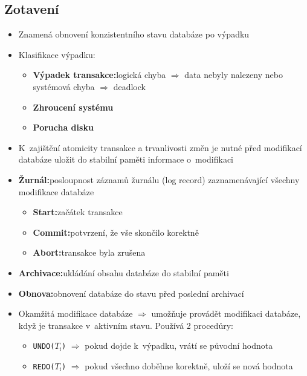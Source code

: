 \documentclass[a4paper,10pt]{article}
\newcommand{\pojem}[2]{\item \textbf{#1:}\quad #2}
\newcommand{\tedy}{$\Rightarrow$ }
\begin{document}
    \subsection{Zotavení}
      \begin{itemize}
        \item Znamená obnovení konzistentního stavu databáze po výpadku
        \item Klasifikace výpadku:
        \begin{itemize}
          \pojem{Výpadek transakce}{logická chyba \tedy data nebyly nalezeny nebo systémová chyba \tedy deadlock}
          \item \textbf{Zhroucení systému}
          \item \textbf{Porucha disku}
        \end{itemize}
        \item K~zajištění atomicity transakce a trvanlivosti změn je nutné před modifikací databáze uložit do stabilní paměti informace o~modifikaci
        \pojem{Žurnál}{posloupnost záznamů žurnálu (log record) zaznamenávající všechny modifikace databáze}
        \begin{itemize}
          \pojem{Start}{začátek transakce}
          \pojem{Commit}{potvrzení, že vše skončilo korektně}
          \pojem{Abort}{transakce byla zrušena}
        \end{itemize}
        \pojem{Archivace}{ukládání obsahu databáze do stabilní paměti}
        \pojem{Obnova}{obnovení databáze do stavu před poslední archivací}
        \item Okamžitá modifikace databáze \tedy umožňuje provádět modifikaci databáze, když je transakce v~aktivním stavu. Používá 2 procedůry:
        \begin{itemize}
          \item \texttt{UNDO($T_\textrm{i}$)} \tedy pokud dojde k~výpadku, vrátí se původní hodnota
          \item \texttt{REDO($T_\textrm{i}$)} \tedy pokud všechno doběhne korektně, uloží se nová hodnota
        \end{itemize}
      \end{itemize}
      \begin{figure}[h!]
        \centering
      \end{figure}
\end{document}
